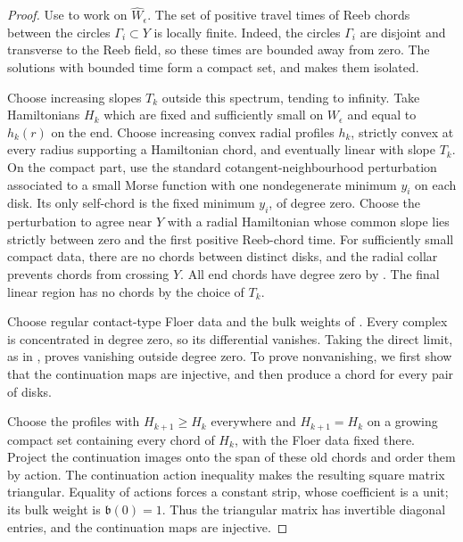 \documentclass[a4paper]{amsart}
\numberwithin{equation}{section}
\begin{document}
\begin{proof}
Use  to work on
$\widehat W_\epsilon$. The set of positive travel times of Reeb chords
between the circles $\Gamma_i\subset Y$ is locally finite. Indeed,
the circles $\Gamma_i$ are disjoint and
transverse to the Reeb field, so these times are bounded away from
zero. The solutions with bounded time form a compact set, and
 makes them isolated.

Choose increasing slopes $T_k$ outside this spectrum, tending to
infinity. Take Hamiltonians $H_k$ which are fixed and sufficiently
small on $W_\epsilon$ and equal to $h_k(r)$ on the end. Choose
increasing convex radial profiles $h_k$, strictly convex at every radius
supporting a Hamiltonian chord, and eventually linear with slope $T_k$.
On the compact part, use the standard cotangent-neighbourhood
perturbation associated to a small Morse function with one nondegenerate
minimum $y_i$ on each disk. Its only self-chord is the fixed minimum
$y_i$, of degree zero. Choose the perturbation to agree near $Y$ with
a radial Hamiltonian whose common slope lies strictly between zero
and the first positive Reeb-chord time.
For sufficiently small compact data, there are no chords between
distinct disks, and the radial collar prevents chords from crossing $Y$.
All end chords have degree zero by .
The final linear region has no chords by the choice of $T_k$.

Choose regular contact-type Floer data and the bulk weights of
. Every complex is concentrated in degree zero,
so its differential vanishes. Taking the direct limit, as in
, proves vanishing outside degree zero.
To prove nonvanishing, we first show that the continuation maps are
injective, and then produce a chord for every pair of disks.

Choose the profiles with $H_{k+1}\ge H_k$ everywhere and
$H_{k+1}=H_k$ on a growing compact set containing every chord of $H_k$,
with the Floer data fixed there. Project the continuation images onto the
span of these old chords and order them by action. The continuation
action inequality makes the resulting square matrix triangular.
Equality of actions forces a constant strip, whose coefficient is a
unit; its bulk weight is $\mathfrak b(0)=1$. Thus the triangular matrix
has invertible diagonal entries, and the continuation maps are injective.


\end{proof}
\end{document}
